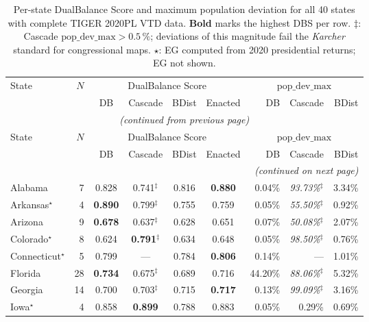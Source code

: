 \begin{longtable}{l r cccc rrr}
\caption{Per-state DualBalance Score and maximum population
deviation for all 40 states with complete TIGER 2020PL VTD data.
\textbf{Bold} marks the highest DBS per row.
$\ddagger$: Cascade $\mathrm{pop\_dev\_max} > 0.5\,\%$; deviations of this magnitude fail the \textit{Karcher} standard for congressional maps.
$\star$: EG computed from 2020 presidential returns; EG not shown.}
\label{tab:multistate-dbs}\\
\toprule
State & $N$ & \multicolumn{4}{c}{DualBalance Score} & \multicolumn{3}{c}{$\mathrm{pop\_dev\_max}$} \\
\cmidrule(lr){3-6}\cmidrule(lr){7-9}
 & & DB & Cascade & BDist & Enacted & DB & Cascade & BDist \\
\midrule
\endfirsthead
\multicolumn{9}{c}{\small\textit{(continued from previous page)}}\\[2pt]
\toprule
State & $N$ & \multicolumn{4}{c}{DualBalance Score} & \multicolumn{3}{c}{$\mathrm{pop\_dev\_max}$} \\
\cmidrule(lr){3-6}\cmidrule(lr){7-9}
 & & DB & Cascade & BDist & Enacted & DB & Cascade & BDist \\
\midrule
\endhead
\midrule\multicolumn{9}{r}{\small\textit{(continued on next page)}}\\\endfoot
\bottomrule\endlastfoot
Alabama & 7 & 0.828 & 0.741$^{\ddagger}$ & 0.816 & \textbf{0.880} & 0.04\% & \textit{93.73\%}$^{\ddagger}$ & 3.34\% \\
Arkansas$^{\star}$ & 4 & \textbf{0.890} & 0.799$^{\ddagger}$ & 0.755 & 0.759 & 0.05\% & \textit{55.50\%}$^{\ddagger}$ & 0.92\% \\
Arizona & 9 & \textbf{0.678} & 0.637$^{\ddagger}$ & 0.628 & 0.651 & 0.07\% & \textit{50.08\%}$^{\ddagger}$ & 2.07\% \\
Colorado$^{\star}$ & 8 & 0.624 & \textbf{0.791}$^{\ddagger}$ & 0.634 & 0.648 & 0.05\% & \textit{98.50\%}$^{\ddagger}$ & 0.76\% \\
Connecticut$^{\star}$ & 5 & 0.799 & --- & 0.784 & \textbf{0.806} & 0.14\% & --- & 1.01\% \\
Florida & 28 & \textbf{0.734} & 0.675$^{\ddagger}$ & 0.689 & 0.716 & 44.20\% & \textit{88.06\%}$^{\ddagger}$ & 5.32\% \\
Georgia & 14 & 0.700 & 0.703$^{\ddagger}$ & 0.715 & \textbf{0.717} & 0.13\% & \textit{99.09\%}$^{\ddagger}$ & 3.16\% \\
Iowa$^{\star}$ & 4 & 0.858 & \textbf{0.899} & 0.788 & 0.883 & 0.05\% & 0.29\% & 0.69\% \\

\end{longtable}
